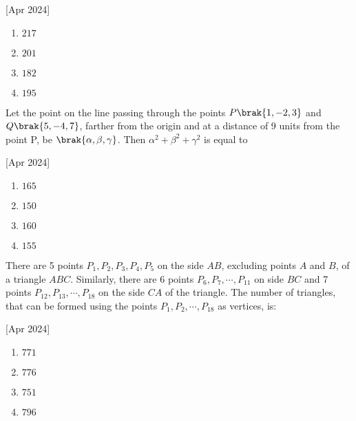     \hfill[Apr 2024]

        \begin{multicols}{4}
            \begin{enumerate}
                \item $217$
                \item $201$
                \item $182$
                \item $195$
            \end{enumerate}
        \end{multicols}

    \item Let the point on the line passing through the points $P\brak{1,-2,3}$ and $Q\brak{5,-4,7}$, farther from the origin and at a distance of 9 units from the point P, be $\brak{\alpha,\beta,\gamma}$. Then $\alpha^2+\beta^2+\gamma^2$ is equal to
    
    \hfill[Apr 2024]

        \begin{multicols}{4}
            \begin{enumerate}
                \item $165$
                \item $150$
                \item $160$
                \item $155$
            \end{enumerate}
        \end{multicols}
		
    \item There are 5 points $P_1,P_2,P_3,P_4,P_5$ on the side $AB$, excluding points $A$ and $B$, of a triangle $ABC$. Similarly, there are 6 points $P_6,P_7,\cdots,P_{11}$ on side $BC$ and 7 points $P_{12},P_{13},\cdots,P_{18}$ on the side $CA$ of the triangle. The number of triangles, that can be formed using the points $P_1,P_2,\cdots,P_{18}$ as vertices, is:
    
    \hfill[Apr 2024]

        \begin{multicols}{4}
            \begin{enumerate}
                \item $771$
                \item $776$
                \item $751$
                \item $796$
            \end{enumerate}
        \end{multicols}

